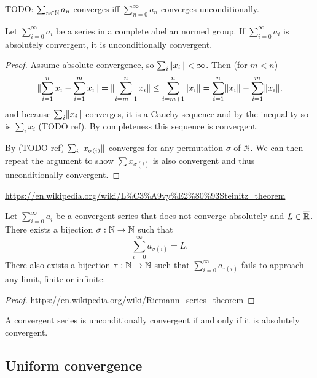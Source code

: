 \begin{lemma}
TODO: $\sum_{n\in\mathbb{N}}a_n$ converges iff $\sum_{n=0}^\infty a_n$ converges unconditionally.
\end{lemma}

\begin{proposition} \label{absoluteConvergenceImpliesConvergence}
Let $\sum_{i=0}^\infty a_i$ be a series in a complete abelian normed group. If $\sum_{i=0}^\infty a_i$ is absolutely convergent, it is unconditionally convergent.
\end{proposition}
\begin{proof}
Assume absolute convergence, so $\sum_i\lVert x_i\rVert<\infty$. Then (for $m< n$)
\[ \lVert\sum_{i=1}^n x_i - \sum_{i=1}^m x_i\rVert = \lVert\sum_{i=m+1}^n x_i\rVert \leq \sum_{i=m+1}^n\lVert x_i\rVert = \sum_{i=1}^n \lVert x_i\rVert - \sum_{i=1}^m \lVert x_i\rVert, \]
and because $\sum_i\lVert x_i\rVert$ converges, it is a Cauchy sequence and by the inequality so is $\sum_i x_i$ (TODO ref). By completeness this sequence is convergent.

By (TODO ref) $\sum_i\lVert x_{\sigma(i)}\rVert$ converges for any permutation $\sigma$ of $\mathbb{N}$. We can then repeat the argument to show $\sum x_{\sigma(i)}$ is also convergent and thus unconditionally convergent.
\end{proof}

\begin{proposition}
\url{https://en.wikipedia.org/wiki/L%C3%A9vy%E2%80%93Steinitz_theorem}
\end{proposition}
\begin{corollary}
Let $\sum_{i=0}^\infty a_i$ be a convergent series that does not converge absolutely and $L\in \overline{\mathbb{R}}$. There exists a bijection $\sigma:\mathbb{N}\to\mathbb{N}$ such that
\[ \sum_{i=0}^\infty a_{\sigma(i)} = L. \]
There also exists a bijection $\tau:\mathbb{N}\to\mathbb{N}$ such that $\sum_{i=0}^\infty a_{\tau(i)}$ fails to approach any limit, finite or infinite.
\end{corollary}
\begin{proof}
\url{https://en.wikipedia.org/wiki/Riemann_series_theorem}
\end{proof}
\begin{corollary}
A convergent series is unconditionally convergent \textup{if and only if} it is absolutely convergent.
\end{corollary}



\subsection{Uniform convergence}

